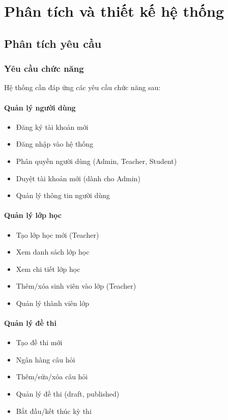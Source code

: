 \documentclass[12pt,a4paper]{report}
\begin{document}
\chapter{Phân tích và thiết kế hệ thống}

\section{Phân tích yêu cầu}

\subsection{Yêu cầu chức năng}

Hệ thống cần đáp ứng các yêu cầu chức năng sau:

\subsubsection{Quản lý người dùng}
\begin{itemize}
    \item Đăng ký tài khoản mới
    \item Đăng nhập vào hệ thống
    \item Phân quyền người dùng (Admin, Teacher, Student)
    \item Duyệt tài khoản mới (dành cho Admin)
    \item Quản lý thông tin người dùng
\end{itemize}

\subsubsection{Quản lý lớp học}
\begin{itemize}
    \item Tạo lớp học mới (Teacher)
    \item Xem danh sách lớp học
    \item Xem chi tiết lớp học
    \item Thêm/xóa sinh viên vào lớp (Teacher)
    \item Quản lý thành viên lớp
\end{itemize}

\subsubsection{Quản lý đề thi}
\begin{itemize}
    \item Tạo đề thi mới
    \item Ngân hàng câu hỏi
    \item Thêm/sửa/xóa câu hỏi
    \item Quản lý đề thi (draft, published)
    \item Bắt đầu/kết thúc kỳ thi
\end{itemize}
\end{document}
